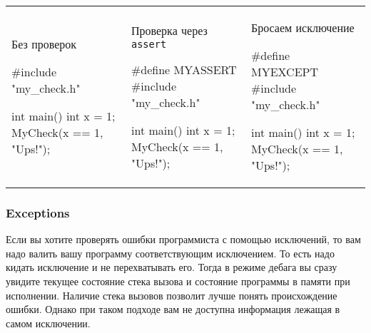 \begin{center}
\begin{tabular}{lll}
{
\begin{minipage}[\baselineskip]{5cm}
Без проверок
\begin{cppcode}[numbers = none]

#include "my_check.h"

int main() {
  int x = 1;
  MyCheck(x == 1, "Ups!");
}
\end{cppcode}
\end{minipage}
}&{
\begin{minipage}[\baselineskip]{5cm}
Проверка через \verb"assert"
\begin{cppcode}[numbers = none]
#define MYASSERT
#include "my_check.h"

int main() {
  int x = 1;
  MyCheck(x == 1, "Ups!");
}
\end{cppcode}
\end{minipage}
}&{
\begin{minipage}[\baselineskip]{5cm}
Бросаем исключение
\begin{cppcode}[numbers = none]
#define MYEXCEPT
#include "my_check.h"

int main() {
  int x = 1;
  MyCheck(x == 1, "Ups!");
}
\end{cppcode}
\end{minipage}
}
\end{tabular}
\end{center}



\subsubsection{Exceptions}

Если вы хотите проверять ошибки программиста с помощью исключений, то вам надо валить вашу программу соответствующим исключением.
То есть надо кидать исключение и не перехватывать его.
Тогда в режиме дебага вы сразу увидите текущее состояние стека вызова и состояние программы в памяти при исполнении.
Наличие стека вызовов позволит лучше понять происхождение ошибки.
Однако при таком подходе вам не доступна информация лежащая в самом исключении.

